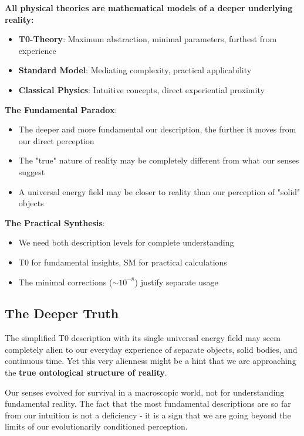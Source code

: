 \documentclass[12pt,a4paper]{article}
\begin{document}
	\begin{tcolorbox}[colback=purple!5!white,colframe=purple!75!black,title=Core Message]
		\textbf{All physical theories are mathematical models of a deeper underlying reality:}
		
		\begin{itemize}
			\item \textbf{T0-Theory}: Maximum abstraction, minimal parameters, furthest from experience
			\item \textbf{Standard Model}: Mediating complexity, practical applicability
			\item \textbf{Classical Physics}: Intuitive concepts, direct experiential proximity
		\end{itemize}
		
		\textbf{The Fundamental Paradox}:
		\begin{itemize}
			\item The deeper and more fundamental our description, the further it moves from our direct perception
			\item The "true" nature of reality may be completely different from what our senses suggest
			\item A universal energy field may be closer to reality than our perception of "solid" objects
		\end{itemize}
		
		\textbf{The Practical Synthesis}:
		\begin{itemize}
			\item We need both description levels for complete understanding
			\item T0 for fundamental insights, SM for practical calculations
			\item The minimal corrections ($\sim 10^{-8}$) justify separate usage
		\end{itemize}
	\end{tcolorbox}
	
	\subsection{The Deeper Truth}
	
	The simplified T0 description with its single universal energy field may seem completely alien to our everyday experience of separate objects, solid bodies, and continuous time. Yet this very alienness might be a hint that we are approaching the \textbf{true ontological structure of reality}.
	
	Our senses evolved for survival in a macroscopic world, not for understanding fundamental reality. The fact that the most fundamental descriptions are so far from our intuition is not a deficiency - it is a sign that we are going beyond the limits of our evolutionarily conditioned perception.
	
\end{document}
